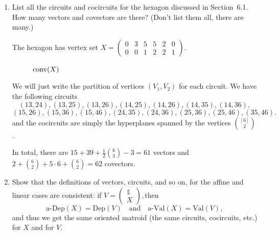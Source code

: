 \documentclass{article}
\begin{document}
\begin{enumerate}
\item List all the circuits and cocircuits for the hexagon discussed in Section~6.1. How many vectors and covectors are there? (Don't list them all, there are many.)

\begin{solution}
    The hexagon has vertex set $X = \begin{pmatrix}
        0 & 3 & 5 & 5 & 2 & 0 \\ 0 & 0 & 1 & 2 & 2 & 1
    \end{pmatrix}$. 
\begin{figure}[h]
    \centering
{}
\caption{$\operatorname{conv}(X)$}
\end{figure}
    
    We will just write the partition of vertices $(V_1, V_2)$ for each circuit. We have the following circuits
    \[(13 ,24), (13, 25), (13, 26), (14, 25), (14, 26), (14, 35), (14, 36), \]
    \[(15, 26), (15, 36), (15, 46), (24, 35), (24, 36), (25, 36), (25, 46), (35, 46).\]
    and the cocircuits are simply the hyperplanes spanned by the vertices $\binom{[6]}{2}$.

    In total, there are $15+39+\frac{1}{2}\binom{6}{3}- 3 = 61$ vectors and $2+\binom{6}{2}+5\cdot 6+\binom{6}{2} = 62$ covectors.
    
\end{solution}

\item Show that the definitions of vectors, circuits, and so on, for the affine and linear cases are consistent: if $V=\begin{pmatrix}
\mathds{1}\\ X 
\end{pmatrix},$then
\[\text{a-Dep}(X)=\text{Dep}(V) \quad\text{and}\quad \text{a-Val}(X)=\text{Val}(V),\]
and thus we get the same oriented matroid (the same circuits, cocircuits, etc.) for $X$ and for $V$.


\end{enumerate}
\end{document}
